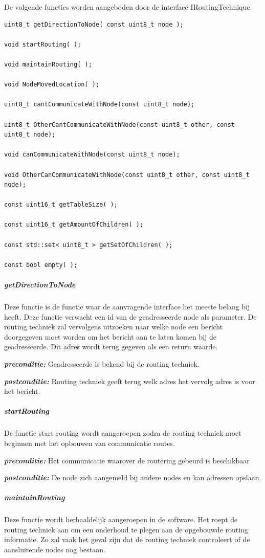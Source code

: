 \documentclass[a4paper, 11pt, oneside]{report}
\begin{document}
De volgende functies worden aangeboden door de interface IRoutingTechnique. 

\begin{lstlisting}
uint8_t getDirectionToNode( const uint8_t node );

void startRouting( );

void maintainRouting( );

void NodeMovedLocation( );

uint8_t cantCommunicateWithNode(const uint8_t node);

uint8_t OtherCantCommunicateWithNode(const uint8_t other, const uint8_t node);

void canCommunicateWithNode(const uint8_t node);

void OtherCanCommunicateWithNode(const uint8_t other, const uint8_t node);

const uint16_t getTableSize( );

const uint16_t getAmountOfChildren( );

const std::set< uint8_t > getSetOfChildren( );

const bool empty( );
\end{lstlisting}
\subparagraph{getDirectionToNode}
Deze functie is de functie waar de aanvragende interface het meeste belang bij heeft.
Deze functie verwacht een id van de geadresseerde node als parameter.
De routing techniek zal vervolgens uitzoeken naar welke node een bericht doorgegeven moet worden om het bericht aan te laten komen bij de geadresseerde.
Dit adres wordt terug gegeven als een return waarde. 

\textbf{\textit{preconditie:}} Geadresseerde is bekend bij de routing techniek.

\textbf{\textit{postconditie:}} Routing techniek geeft terug welk adres het vervolg adres is voor het bericht.

\subparagraph{startRouting}
De functie start routing wordt aangeroepen zodra de routing techniek moet beginnen met het opbouwen van communicatie routes.

\textbf{\textit{preconditie:}} Het communicatie waarover de routering gebeurd is beschikbaar

\textbf{\textit{postconditie:}} De node zich aangemeld bij andere nodes en kan adressen opslaan.

\subparagraph{maintainRouting}
Deze functie wordt herhaaldelijk aangeroepen in de software.
Het roept de routing techniek aan om een onderhoud te plegen aan de opgebouwde routing informatie.
Zo zal vaak het geval zijn dat de routing techniek controleert of de aansluitende nodes nog bestaan.
\end{document}
